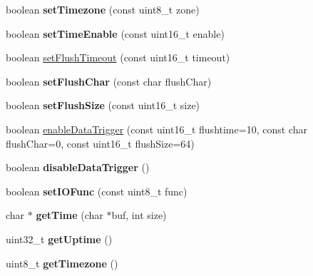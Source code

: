 \begin{DoxyCompactItemize}
\item 
\hypertarget{class_wi_fly_a48ed5f8e44678412dddab96be9dc339d}{
boolean {\bfseries set\-Timezone} (const uint8\-\_\-t zone)}
\label{class_wi_fly_a48ed5f8e44678412dddab96be9dc339d}

\item 
\hypertarget{class_wi_fly_ac8b3704b10a605f63d2caba603c65680}{
boolean {\bfseries set\-Time\-Enable} (const uint16\-\_\-t enable)}
\label{class_wi_fly_ac8b3704b10a605f63d2caba603c65680}

\item 
boolean \hyperlink{class_wi_fly_ae7cdd4d36010ead8a1a49f7d6c7654bc}{set\-Flush\-Timeout} (const uint16\-\_\-t timeout)
\item 
\hypertarget{class_wi_fly_a4df072b7a2808652f4a802ba45bfa5f9}{
boolean {\bfseries set\-Flush\-Char} (const char flush\-Char)}
\label{class_wi_fly_a4df072b7a2808652f4a802ba45bfa5f9}

\item 
\hypertarget{class_wi_fly_a7d2052dd07bb45f5e98bcfaed53984b6}{
boolean {\bfseries set\-Flush\-Size} (const uint16\-\_\-t size)}
\label{class_wi_fly_a7d2052dd07bb45f5e98bcfaed53984b6}

\item 
boolean \hyperlink{class_wi_fly_aa253afdc746f88821ea5aaebd544d0ff}{enable\-Data\-Trigger} (const uint16\-\_\-t flushtime=10, const char flush\-Char=0, const uint16\-\_\-t flush\-Size=64)
\item 
\hypertarget{class_wi_fly_ae8cce3e97b24ab373386bc4b5f201454}{
boolean {\bfseries disable\-Data\-Trigger} ()}
\label{class_wi_fly_ae8cce3e97b24ab373386bc4b5f201454}

\item 
\hypertarget{class_wi_fly_a50d5f995521c363ccb090b622a9e7650}{
boolean {\bfseries set\-I\-O\-Func} (const uint8\-\_\-t func)}
\label{class_wi_fly_a50d5f995521c363ccb090b622a9e7650}

\item 
\hypertarget{class_wi_fly_a455d4524e3279b8f26953da826e99cd1}{
char $\ast$ {\bfseries get\-Time} (char $\ast$buf, int size)}
\label{class_wi_fly_a455d4524e3279b8f26953da826e99cd1}

\item 
\hypertarget{class_wi_fly_a78cd1813cd45527254c4a743b7017547}{
uint32\-\_\-t {\bfseries get\-Uptime} ()}
\label{class_wi_fly_a78cd1813cd45527254c4a743b7017547}

\item 
\hypertarget{class_wi_fly_a0b6fdfd506c6953d4b1bff87069380e6}{
uint8\-\_\-t {\bfseries get\-Timezone} ()}
\label{class_wi_fly_a0b6fdfd506c6953d4b1bff87069380e6}


\end{DoxyCompactItemize}

